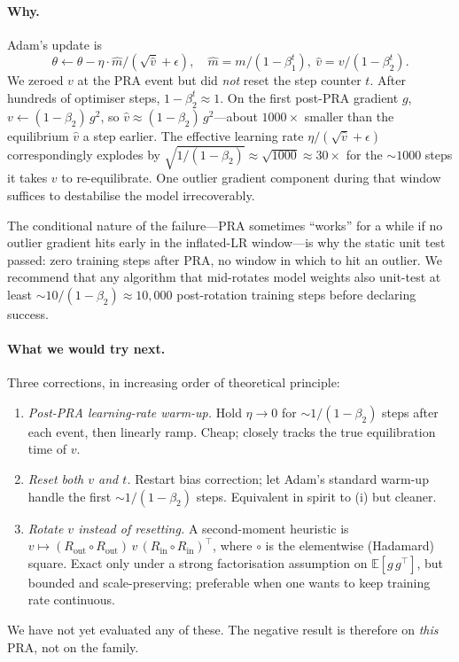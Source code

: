 \documentclass[11pt]{article}
\newcommand{\pra}{\textsc{PRA}}
\begin{document}
\paragraph{Why.}
Adam's update is
\begin{equation}
\theta \leftarrow \theta - \eta \cdot \hat{m}/(\sqrt{\hat{v}} + \epsilon),
\quad
\hat{m} = m/(1-\beta_1^t),\
\hat{v} = v/(1-\beta_2^t).
\end{equation}
We zeroed $v$ at the \pra{} event but did \emph{not} reset the step
counter $t$. After hundreds of optimiser steps, $1-\beta_2^t \approx 1$.
On the first post-\pra{} gradient $g$, $v \leftarrow (1-\beta_2)\,g^2$,
so $\hat{v}\!\approx\!(1-\beta_2)\,g^2$---about $1000\times$ smaller than
the equilibrium $\hat{v}$ a step earlier. The effective learning rate
$\eta/(\sqrt{\hat{v}}+\epsilon)$ correspondingly explodes by
$\sqrt{1/(1-\beta_2)}\!\approx\!\sqrt{1000}\!\approx\!30\times$ for the
$\sim\!1000$ steps it takes $v$ to re-equilibrate. One outlier gradient
component during that window suffices to destabilise the model
irrecoverably.

The conditional nature of the failure---\pra{} sometimes ``works'' for a
while if no outlier gradient hits early in the inflated-LR window---is
why the static unit test passed: zero training steps after PRA, no
window in which to hit an outlier. We recommend that any algorithm that
mid-rotates model weights also unit-test at least
$\sim\!10/(1{-}\beta_2)\approx 10{,}000$ post-rotation training steps
before declaring success.

\paragraph{What we would try next.}
Three corrections, in increasing order of theoretical principle:
\begin{enumerate}[leftmargin=*,nosep,label=(\roman*)]
  \item \emph{Post-\pra{} learning-rate warm-up.} Hold $\eta\!\to\!0$ for
        $\sim\!1/(1-\beta_2)$ steps after each event, then linearly ramp.
        Cheap; closely tracks the true equilibration time of $v$.
  \item \emph{Reset both $v$ and $t$.} Restart bias correction; let
        Adam's standard warm-up handle the first $\sim\!1/(1-\beta_2)$
        steps. Equivalent in spirit to (i) but cleaner.
  \item \emph{Rotate $v$ instead of resetting.} A second-moment heuristic
        is $v \mapsto (R_{\mathrm{out}}{\circ}R_{\mathrm{out}})\,v\,(R_{\mathrm{in}}{\circ}R_{\mathrm{in}})^\top$,
        where ${\circ}$ is the elementwise (Hadamard) square. Exact only
        under a strong factorisation assumption on $\mathbb{E}[g\,g^\top]$,
        but bounded and scale-preserving; preferable when one wants to
        keep training rate continuous.
\end{enumerate}
We have not yet evaluated any of these. The negative result is therefore
on \emph{this} \pra{}, not on the family.
\end{document}
